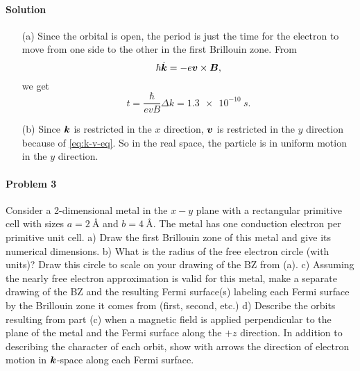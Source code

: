 \documentclass[hyperref, a4paper]{article}
\begin{document}
\paragraph{Solution} \begin{itemize}
\item[(a)] Since the orbital is open,
the period is just the time for the electron to move from one side to the other 
in the first Brillouin zone.
From 
\begin{equation}
    \hbar \dot{\vb*{k}} = - e \vb*{v} \times \vb*{B},
    \label{eq:k-v-eq}
\end{equation}
we get 
\begin{equation}
    t = \frac{\hbar}{e v B} \Delta k = \SI{1.3e-10}{s}.
\end{equation}
\item[(b)] Since $\vb*{k}$ is restricted in the $x$ direction,
$\vb*{v}$ is restricted in the $y$ direction because of \eqref{eq:k-v-eq}.
So in the real space, the particle is in uniform motion in the $y$ direction.
\end{itemize}

\paragraph{Problem 3} Consider a 2-dimensional metal in the $x-y$ plane with a rectangular primitive cell with sizes $a=\SI{2}{\angstrom}$ and $b=\SI{4}{\angstrom}$. The metal has one conduction electron per primitive unit cell.
a) Draw the first Brillouin zone of this metal and give its numerical dimensions.
b) What is the radius of the free electron circle (with units)? Draw this circle to scale on your drawing of the BZ from (a).
c) Assuming the nearly free electron approximation is valid for this metal, make a separate drawing of the BZ and the resulting Fermi surface(s) labeling each Fermi surface by the Brillouin zone it comes from (first, second, etc.)
d) Describe the orbits resulting from part (c) when a magnetic field is applied perpendicular to the plane of the metal and the Fermi surface along the $+z$ direction. In addition to describing the character of each orbit, show with arrows the direction of electron motion in $\vb*{k}$-space along each Fermi surface.
\end{document}
